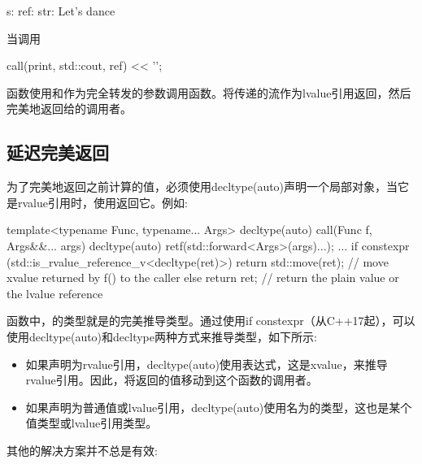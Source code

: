 \begin{outputcode}
s:
ref:
str: Let's dance
\end{outputcode}

当调用

\begin{cppcode}
call(print, std::cout, ref) << '\n';
\end{cppcode}

函数使用和作为完全转发的参数调用函数。将传递的流作为lvalue引用返回，然后完美地返回给的调用者。

\subsection{延迟完美返回}

为了完美地返回之前计算的值，必须使用decltype(auto)声明一个局部对象，当它是rvalue引用时，使用返回它。例如:

\begin{cppcode}
template<typename Func, typename... Args>
decltype(auto) call(Func f, Args&&... args)
{
	decltype(auto) ret{f(std::forward<Args>(args)...)};
	...
	if constexpr (std::is_rvalue_reference_v<decltype(ret)>) {
		return std::move(ret); // move xvalue returned by f() to the caller
	}
	else {
		return ret; // return the plain value or the lvalue reference
	}
}
\end{cppcode}

函数中，的类型就是的完美推导类型。通过使用if constexpr（从C++17起），可以使用decltype(auto)和decltype两种方式来推导类型，如下所示:

\begin{itemize}
	\item 如果声明为rvalue引用，decltype(auto)使用表达式，这是xvalue，来推导rvalue引用。因此，将返回的值移动到这个函数的调用者。
	\item 如果声明为普通值或lvalue引用，decltype(auto)使用名为的类型，这也是某个值类型或lvalue引用类型。
\end{itemize}

其他的解决方案并不总是有效:

